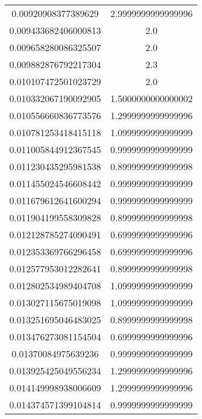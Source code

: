 \begin{table}
\begin{tabular}{S[]S[]}
0.00920908377389629 & 2.9999999999999996\\
0.009433682406000813 & 2.0\\
0.009658280086325507 & 2.0\\
0.009882876792217304 & 2.3\\
0.010107472501023729 & 2.0\\
0.010332067190092905 & 1.5000000000000002\\
0.010556660836773576 & 1.2999999999999996\\
0.010781253418415118 & 1.0999999999999999\\
0.011005844912367545 & 0.9999999999999999\\
0.011230435295981538 & 0.8999999999999998\\
0.011455024546608442 & 0.9999999999999999\\
0.011679612641600294 & 0.9999999999999999\\
0.011904199558309828 & 0.8999999999999998\\
0.012128785274090491 & 0.6999999999999996\\
0.012353369766296458 & 0.6999999999999996\\
0.012577953012282641 & 0.8999999999999998\\
0.012802534989404708 & 1.0999999999999999\\
0.013027115675019098 & 1.0999999999999999\\
0.013251695046483025 & 0.8999999999999998\\
0.013476273081154504 & 0.6999999999999996\\
0.01370084975639236 & 0.9999999999999999\\
0.013925425049556234 & 1.2999999999999996\\
0.014149998938006609 & 1.2999999999999996\\
0.014374571399104814 & 0.9999999999999999\\
\bottomrule
\end{tabular}\end{table}